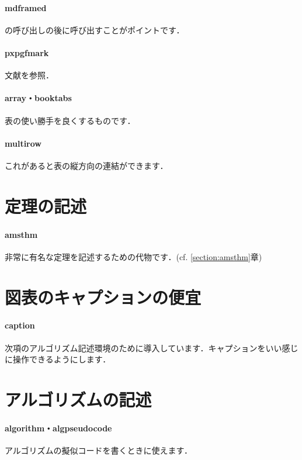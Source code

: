 \documentclass[uplatex]{jsreport}
\begin{document}
\paragraph{mdframed} {\TikZ}の呼び出しの後に呼び出すことがポイントです\cite{mdframed}．
\paragraph{pxpgfmark} 文献\cite{pxpgfmark}を参照．
\paragraph{array・booktabs} 表の使い勝手を良くするものです\cite{array,booktabs}．
\paragraph{multirow} これがあると表の縦方向の連結ができます\cite{multirow}．

\section{定理の記述}
\paragraph{amsthm} 非常に有名な定理を記述するための代物です\cite{amsthm}．(cf. \ref{section:amsthm}章)

\section{図表のキャプションの便宜}
\paragraph{caption} 次項のアルゴリズム記述環境のために導入しています．キャプションをいい感じに操作できるようにします\cite{caption}．

\section{アルゴリズムの記述}
\paragraph{algorithm・algpseudocode} アルゴリズムの擬似コードを書くときに使えます\cite{algorithms,algorithmicx}．
\end{document}
